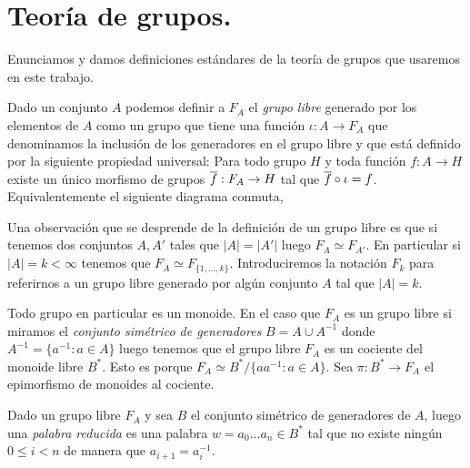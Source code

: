 \documentclass[tesis.tex]{subfiles}
\begin{document}
\section{Teoría de grupos.}\label{secc_teo_grp}

Enunciamos y damos definiciones estándares de la teoría de grupos que usaremos en este trabajo.


\begin{deff}
	Dado un conjunto $A$ podemos definir a $F_{A}$ el \emph{grupo libre} generado por los elementos de $A$ como un grupo que tiene una función  $\iota: A \to F_{A}$ que denominamos la inclusión de los generadores en el grupo libre y que está definido por la siguiente propiedad universal: 
	Para todo grupo $H$ y toda función $f:A \to H$ existe un único morfismo de grupos $\overline f: F_{A} \to H$ tal que $\overline f \circ \iota = f$.
	Equivalentemente el siguiente diagrama conmuta,
	\begin{center}
	\end{center}
	
\end{deff}

\begin{obs}
	Una observación que se desprende de la definición de un grupo libre es que si tenemos dos conjuntos $A, A'$ tales que $|A| = |A'|$ luego $F_{A} \simeq F_{A'}$.
	En particular si $|A|=k < \infty$ tenemos que $F_{A} \simeq F_{ \{1, \dots, k \} }$.
	Introduciremos la notación $F_{k}$ para referirnos a un grupo libre generado por algún conjunto $A$ tal que $|A| = k$.
\end{obs}

Todo grupo en particular es un monoide.
En el caso que $F_{A}$ es un grupo libre si miramos el \emph{conjunto simétrico de generadores} $B = A \cup A^{-1}$ donde $A^{-1} = \{ a^{-1} : a \in A \}$ luego tenemos que el grupo libre $F_{A}$ es un cociente del monoide libre $B^*$.
Esto es porque $F_{A} \simeq B^{*} / \{ aa^{-1} : a \in A \}$.
Sea $\pi: B^{*} \to F_{A}$ el epimorfismo de monoides al cociente.


\begin{deff}
	Dado un grupo libre $F_{A}$ y sea $B$ el conjunto simétrico de generadores de $A$, luego una \emph{palabra reducida} es una palabra $w = a_{0} \dots a_{n} \in B^{*}$ tal que no existe ningún $0 \le i < n$ de manera que $a_{i+1}=a_{i}^{-1}$.
\end{deff}
\end{document}
